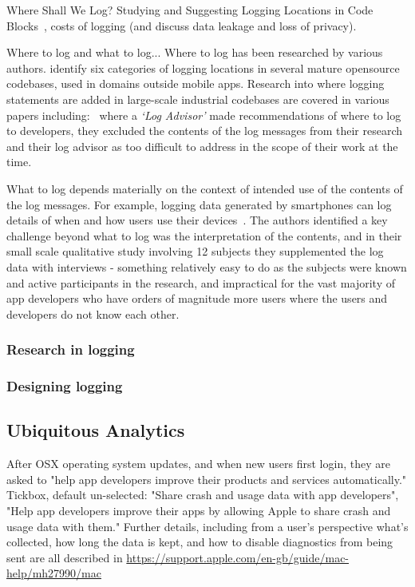 Where Shall We Log? Studying and Suggesting Logging Locations in Code Blocks~\cite{li2020_where_shall_we_log}, costs of logging (and discuss data leakage and loss of privacy).


Where to log and what to log... Where to log has been researched by various authors. \cite{li2020_where_shall_we_log} identify six categories of logging locations in several mature opensource codebases, used in domains outside mobile apps. Research into where logging statements are added in large-scale industrial codebases are covered in various papers including:~\cite{zhu2015_learning_to_log} where a \emph{`Log Advisor'} made recommendations of where to log to developers, they excluded the contents of the log messages from their research and their log advisor as too difficult to address in the scope of their work at the time.

What to log depends materially on the context of intended use of the contents of the log messages. For example, logging data generated by smartphones can log details of when and how users use their devices~\citep{ormen2015_smartphone_log_data_qualitative_perspective}. The authors identified a key challenge beyond what to log was the interpretation of the contents, and in their small scale qualitative study involving 12 subjects they supplemented the log data with interviews - something relatively easy to do as the subjects were known and active participants in the research, and impractical for the vast majority of app developers who have orders of magnitude more users where the users and developers do not know each other.


\subsubsection{Research in logging}

\subsubsection{Designing logging}

\subsection{Ubiquitous Analytics}
After OSX operating system updates, and when new users first login, they are asked to "help app developers improve their products and services automatically." Tickbox, default un-selected: "Share crash and usage data with app developers", "Help app developers improve their apps by allowing Apple to share crash and usage data with them." Further details, including from a user's perspective what's collected, how long the data is kept, and how to disable diagnostics from being sent are all described in \url{https://support.apple.com/en-gb/guide/mac-help/mh27990/mac}


